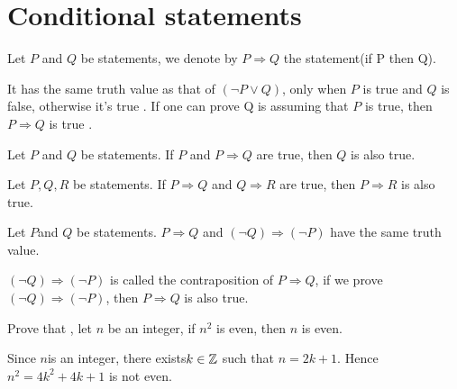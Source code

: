 \documentclass{book}
\numberwithin{equation}{section}
\begin{document}
\section{Conditional statements}
\begin{definitionenv}
    Let $P$ and $Q$ be statements, we denote by $P\Rightarrow Q$ the statement(if P then Q).
\end{definitionenv}
\begin{remark}
    It has the same truth value as that of $(\neg P\vee Q)$, only when $P$ is true and $Q$ is false,  otherwise it's true .
    \newline
    If one can prove Q is assuming that $P$ is true,  then $P\Rightarrow Q$ is true .
\end{remark}
\begin{propositionenv}
    Let $P$ and $Q$ be statements. If $P$ and $P\Rightarrow Q$ are true,  then $Q$ is also true.
\end{propositionenv}
\begin{propositionenv}
    Let $P, Q, R$ be statements. If $P \Rightarrow Q$ and $Q\Rightarrow R$ are true,  then $P\Rightarrow R$ is also true.
\end{propositionenv}
\begin{theoremenv}
    Let $P$and $Q$ be statements. $P\Rightarrow Q$ and $(\neg Q)\Rightarrow (\neg P)$ have the same truth value.
\end{theoremenv}
$(\neg Q)\Rightarrow (\neg P)$ is called the contraposition of $P\Rightarrow Q$,  if we prove $(\neg Q)\Rightarrow (\neg P)$,  then $P\Rightarrow Q$ is also true.
\begin{exampleenv}
    Prove that , let $n$ be an integer,  if $n^2$ is even,  then $n$ is even.
    \begin{proofenv}
        Since $n$is an integer,  there exists$k\in \mathbb{Z}$ such that $n=2k+1$. Hence $n^2=4k^2+4k+1$ is not even.
    \end{proofenv}
\end{exampleenv}
\end{document}
